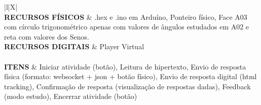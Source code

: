 \begin{xltabular}{\textwidth}{|l|X|}
	 \\ \hline
	\textbf{RECURSOS FÍSICOS} & .hex e .ino em Arduíno, Ponteiro físico, Face A03 com círculo trigonométrico apenas com valores de ângulos estudados em A02 e reta com valores dos Senos.  \\ \hline
	\textbf{RECURSOS DIGITAIS} & Player Virtual \\ \hline		
	 \\ \hline
	\textbf{ITENS} & Iniciar atividade (botão), Leitura de hipertexto, Envio de resposta física (formato: websocket + json + botão físico), Envio de resposta digital (html tracking), Confirmação de resposta (visualização de respostas dadas), Feedback (modo estudo), Encerrar atividade (botão)  \\ \hline
	
\end{xltabular}

